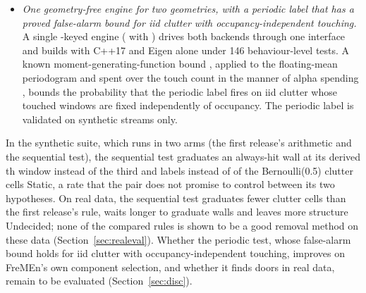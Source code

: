 \begin{itemize}
  \item \emph{One geometry-free engine for two geometries, with a periodic label that has a proved false-alarm bound for iid clutter with occupancy-independent touching.} A single -keyed engine ( with ) drives both backends through one  interface and builds with C++17 and Eigen alone under 146 behaviour-level tests. A known moment-generating-function bound \citep{hsu2012tail}, applied to the floating-mean periodogram \citep{zechmeister2009gls} and spent over the touch count in the manner of alpha spending \citep{lan1983discrete}, bounds the probability that the periodic label fires on iid clutter whose touched windows are fixed independently of occupancy. The periodic label is validated on synthetic streams only.
\end{itemize}

In the synthetic suite, which runs in two arms (the first release's arithmetic and the sequential test), the sequential test graduates an always-hit wall at its derived \SqEoneFirstWindow{}th window instead of the third and labels \SqEsixShipped{} instead of \SqEsixShippedLeg{} of the \SqCellsAperiodic{} Bernoulli(0.5) clutter cells Static, a rate that the pair does not promise to control between its two hypotheses. On real data, the sequential test graduates fewer clutter cells than the first release's rule, waits longer to graduate walls and leaves more structure Undecided; none of the compared rules is shown to be a good removal method on these data (Section~\ref{sec:realeval}). Whether the periodic test, whose false-alarm bound holds for iid clutter with occupancy-independent touching, improves on FreMEn's own component selection, and whether it finds doors in real data, remain to be evaluated (Section~\ref{sec:disc}).

